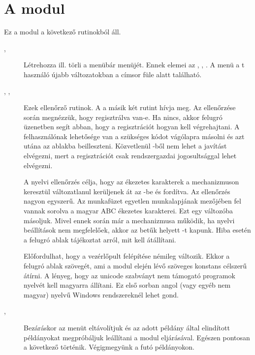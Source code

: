 \section{A  modul}\label{sec:5.1}
Ez a modul a következő rutinokból áll.
\begin{description}
\item[, ] Létrehozza ill. törli a
  menübár  
  menüjét. Ennek elemei az , , . A  menü a t
használó újabb 
  változatokban a címsor  füle alatt található.
\item[, , ]
  Ezek ellenőrző rutinok. A  a másik két
  rutint hívja meg.  Az  ellenőrzése során megnézzük, hogy
   regisztrálva van-e.  Ha nincs, akkor felugró
  üzenetben segít abban, hogy a regisztrációt hogyan kell
  végrehajtani. A felhasználónak lehetősége van a szükséges  kódot
  vágólapra másolni és azt utána az  ablakba
  beilleszteni. Közvetlenül -ből nem lehet a javítást elvégezni,
  mert a regisztrációt csak rendszergazdai jogosultsággal lehet
  elvégezni. 
  
  A nyelvi ellenőrzés célja, hogy az ékezetes karakterek
  a  mechanizmuson keresztül változatlanul kerüljenek át az
  -be 
  és fordítva. Az ellenőrzés nagyon egyszerű. Az  munkafüzet
  egyetlen munkalapjának  mezőjében fel vannak sorolva a magyar
  ABC ékezetes karakterei. Ezt egy  változóba másoljuk. Mivel ennek
  során már a  mechanizmusa működik, ha nyelvi beállítások nem
  megfelelőek, akkor az  betűk helyett -t kapunk. Hiba esetén
  a felugró ablak tájékoztat arról, mit kell átállítani.

  Előfordulhat, hogy a vezérlőpult felépítése
  némileg változik. Ekkor a felugró ablak szövegét, ami a modul
  elején lévő szöveges konstans célszerű átírni. A lényeg, hogy az 
  unicode szabványt nem támogató programok nyelvét kell magyarra
  állítani. Ez első sorban angol (vagy egyéb nem magyar) nyelvű
  Windows rendszereknél lehet gond. 
\item[, ]
  Bezáráskor az  menüt eltávolítjuk és az
  adott  példány által elindított  példányokat megpróbáljuk
  leállítani a  modul  eljárásával. Egészen pontosan a
  következő történik. Végigmegyünk a futó  példányokon.  


\end{description}
